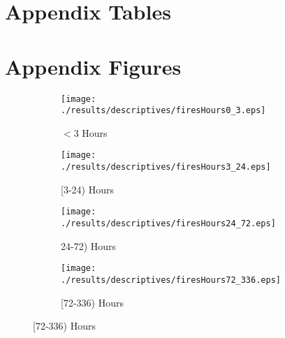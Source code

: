 \documentclass[11pt]{article}
\begin{document}




\setcounter{table}{0}
\renewcommand{\thetable}{A\arabic{table}}
\setcounter{figure}{0}
\renewcommand{\thefigure}{A\arabic{figure}}
    
\section{Appendix Tables}   
\label{app:Tables}





\clearpage
\section{Appendix Figures} 
\label{app:Figures}
\begin{figure}[H]
    \centering
    \caption{Wildfire Exposures by Duration of Fire}
    \label{fig:firesHours}
    \begin{subfigure}{0.45\textwidth}
          \texttt{[image: ./results/descriptives/firesHours0\_3.eps]}
         \caption{$<$3 Hours}
    \end{subfigure}
    \begin{subfigure}{0.45\textwidth}
          \texttt{[image: ./results/descriptives/firesHours3\_24.eps]}
         \caption{[3-24) Hours}
    \end{subfigure}

    \begin{subfigure}{0.45\textwidth}
          \texttt{[image: ./results/descriptives/firesHours24\_72.eps]}
         \caption{24-72) Hours}
    \end{subfigure}
    \begin{subfigure}{0.45\textwidth}
          \texttt{[image: ./results/descriptives/firesHours72\_336.eps]}
         \caption{[72-336) Hours}
    \end{subfigure}
\end{figure}
\FloatBarrier
\end{document}
